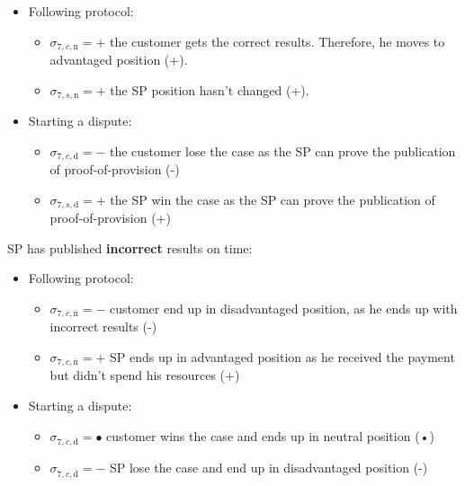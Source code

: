 \documentclass{ieeeaccess}
\begin{document}
\begin{itemize}
\item
  Following protocol:

  \begin{itemize}
  
  \item
    \(\sigma_{7, c, \mathrm{n}} = +\) the customer gets the correct
    results. Therefore, he moves to advantaged position (+).
  \item
    \(\sigma_{7, s, \mathrm{n}} = +\) the SP position hasn't changed
    (+).
  \end{itemize}
\item
  Starting a dispute:

  \begin{itemize}
  
  \item
    \(\sigma_{7, c, \mathrm{d}} = -\) the customer lose the case as the
    SP can prove the publication of proof-of-provision (-)
  \item
    \(\sigma_{7, s, \mathrm{d}} = +\) the SP win the case as the SP can
    prove the publication of proof-of-provision (+)
  \end{itemize}
\end{itemize}

SP has published \textbf{incorrect} results on time:

\begin{itemize}
\item
  Following protocol:

  \begin{itemize}
  
  \item
    \(\sigma_{7, c, \overline{\mathrm{n}}} = -\) customer end up in
    disadvantaged position, as he ends up with incorrect results (-)
  \item
    \(\sigma_{7, c, \overline{\mathrm{n}}} = +\) SP ends up in advantaged
    position as he received the payment but didn't spend his resources
    (+)
  \end{itemize}
\item
  Starting a dispute:

  \begin{itemize}
  
  \item
    \(\sigma_{7, c, \overline{\mathrm{d}}} = •\) customer wins the case
    and ends up in neutral position (•)
  \item
    \(\sigma_{7, c, \overline{\mathrm{d}}} = -\) SP lose the case and
    end up in disadvantaged position (-)
  \end{itemize}
\end{itemize}
\end{document}
